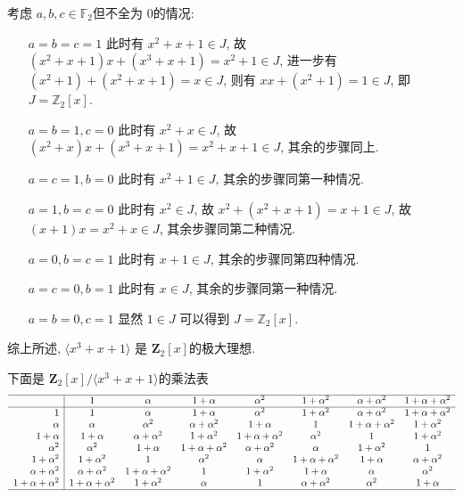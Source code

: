 \documentclass[a4paper,12pt]{ctexart}
\newcommand{\Z}{\mathbb{Z}}
\newcommand{\F}{\mathbb{F}}
\begin{document}
    考虑 $ a,b,c\in\F_2 $但不全为 $ 0 $的情况:
    \begin{enumerate}
      \item[$ a=b=c=1 $] 此时有 $ x^2+x+1\in J $, 故 $ (x^2+x+1)x+(x^3+x+1)=x^2+1\in J $, 进一步有 $ (x^2+1)+(x^2+x+1)=x\in J $, 
      则有 $ xx+(x^2+1)=1\in J $, 即 $ J=\Z_{2}[x] $.
      \item[$ a=b=1,c=0 $] 此时有 $ x^2+x\in J $, 故 $ (x^2+x)x+(x^3+x+1)=x^2+x+1\in J $, 其余的步骤同上.
      \item[$ a=c=1,b=0 $] 此时有 $ x^2+1\in J $, 其余的步骤同第一种情况.
      \item[$ a=1,b=c=0 $] 此时有 $ x^2\in J $, 故 $ x^2+(x^2+x+1)=x+1\in J $, 故 $ (x+1)x=x^2+x\in J $, 其余步骤同第二种情况.
      \item[$ a=0,b=c=1 $] 此时有 $ x+1\in J $, 其余的步骤同第四种情况. 
      \item[$ a=c=0,b=1 $] 此时有 $ x\in J $, 其余的步骤同第一种情况.
      \item[$ a=b=0,c=1 $] 显然 $ 1\in J $ 可以得到 $ J=\Z_2[x] $.
    \end{enumerate}
    综上所述, $ \langle x^3+x+1\rangle $ 是 $ \mathbf{Z}_2[x] $的极大理想.

    下面是 $\mathbf{Z}_2[x] /\langle x^3+x+1\rangle$的乘法表
    \[\begin{array}{r|ccccccc}
      \hline
       & 1 &\alpha& 1+\alpha & \alpha^2 & 1+\alpha^2 & \alpha+\alpha^2 & 1+\alpha+\alpha^2\\
       \hline
      1 & 1 &\alpha &1+\alpha & \alpha^2 & 1+\alpha^2 & \alpha+\alpha^2 & 1+\alpha+\alpha^2\\
      \alpha & \alpha & \alpha^2 & \alpha+\alpha^2 & 1+\alpha  & 1 &1+\alpha+\alpha^2 & 1+ \alpha^2\\
      1+\alpha & 1+\alpha & \alpha+\alpha^2 & 1+\alpha^2 & 1+\alpha+\alpha^2  & \alpha^2 &1& 1+ \alpha^2\\
      \alpha^2 & \alpha^2 & 1+\alpha & 1+\alpha+\alpha^2 & \alpha+\alpha^2 & \alpha &1+\alpha^2 & 1\\
      1+\alpha^2 & 1+\alpha^2 & 1 &  \alpha^2 &  \alpha & 1+\alpha+\alpha^2 &1+\alpha& \alpha+ \alpha^2\\
      \alpha+\alpha^2 & \alpha+\alpha^2 & 1+\alpha+\alpha^2 &  1&1+\alpha^2 & 1+\alpha & \alpha&\alpha^2\\
      1+\alpha+\alpha^2 & 1+\alpha+\alpha^2 & 1+\alpha^2 &\alpha&1 & \alpha+\alpha^2 & \alpha^2&1+\alpha\\
      \hline
    \end{array}\]
\end{document}
